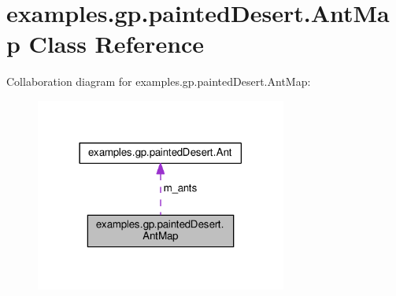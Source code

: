 \hypertarget{classexamples_1_1gp_1_1painted_desert_1_1_ant_map}{\section{examples.\-gp.\-painted\-Desert.\-Ant\-Map Class Reference}
\label{classexamples_1_1gp_1_1painted_desert_1_1_ant_map}
}


Collaboration diagram for examples.\-gp.\-painted\-Desert.\-Ant\-Map\-:
\nopagebreak
\begin{figure}[H]
\begin{center}
\leavevmode
\includegraphics[width=234pt]{classexamples_1_1gp_1_1painted_desert_1_1_ant_map__coll__graph}
\end{center}
\end{figure}
